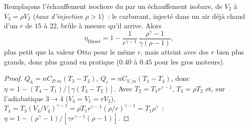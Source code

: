 \begin{proposition}\label{prop:b1:heat-engines:diesel}
Remplaçons l'échauffement isochore du  par un échauffement isobare,
de $V_2$ à $V_3 = \rho V_2$ (\emph{taux d'injection} $\rho > 1$)~: le carburant,
injecté dans un air déjà chaud d'un  $r$ de $15$ à $22$,
brûle à mesure qu'il arrive. Alors
\[
\eta_{\text{Diesel}} = 1 - \frac{1}{r^{\gamma-1}}\,\frac{\rho^{\gamma} - 1}{\gamma(\rho - 1)} ,
\]
plus petit que la valeur Otto pour le même $r$, mais atteint avec des $r$
bien plus grands, donc plus grand en pratique ($0.40$ à $0.45$ pour les gros moteurs).
\end{proposition}

\begin{proof}
$Q_h = nC_{P,m}(T_3 - T_2)$, $Q_c = nC_{V,m}(T_1 - T_4)$, donc $\eta = 1 -
(T_4 - T_1)/[\gamma(T_3 - T_2)]$. Avec $T_2 = T_1r^{\gamma-1}$, $T_3 =
\rho T_2$ et, sur l'adiabatique $3 \to 4$ ($V_4 = V_1 = rV_2$), $T_4 =
T_3(V_3/V_4)^{\gamma-1} = \rho T_1 r^{\gamma-1}(\rho/r)^{\gamma-1} = T_1\rho^{\gamma}$~:
$\eta = 1 - (\rho^\gamma - 1)/[\gamma r^{\gamma-1}(\rho - 1)]$.
\end{proof}


